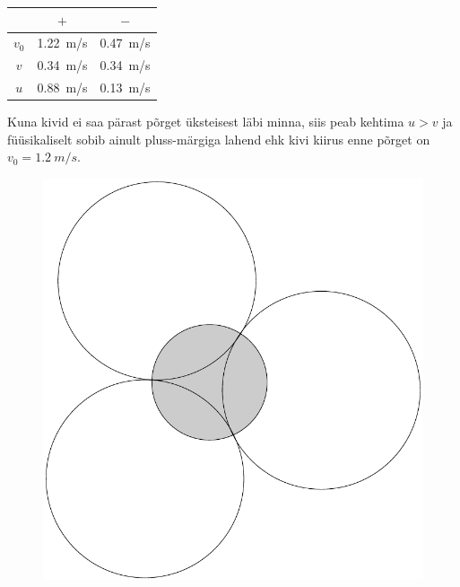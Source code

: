 \documentclass[12pt,a5paper]{article}
\begin{document}
\begin{center}
\begin{tabular}{|c|c|c|}
\hline 
 & $+$ & $-$ \\ 
\hline 
$v_0$ & \SI{1.22}{m/s} & \SI{0.47}{m/s} \\ 
\hline 
$v$ & \SI{0.34}{m/s} & \SI{0.34}{m/s} \\ 
\hline 
$u$ & \SI{0.88}{m/s} & \SI{0.13}{m/s} \\ 
\hline 
\end{tabular}
\end{center}

Kuna kivid ei saa pärast põrget üksteisest läbi minna, siis peab kehtima $u > v$ ja füüsikaliselt sobib ainult pluss-märgiga lahend ehk kivi kiirus enne põrget on $v_0 = \SI{1.2}{m/s}$.

\begin{figure}
  \vspace{-25pt}
  \begin{center}
\includegraphics[scale=0.3]{l6ks-lah.pdf}
  \end{center}
  \vspace{-20pt}
\end{figure}
\end{document}
